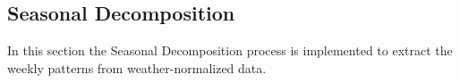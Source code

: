 \subsection{Seasonal Decomposition}
\label{sec:seasonaldecomposition}

In this section the Seasonal Decomposition process is implemented to extract the weekly patterns from weather-normalized data.